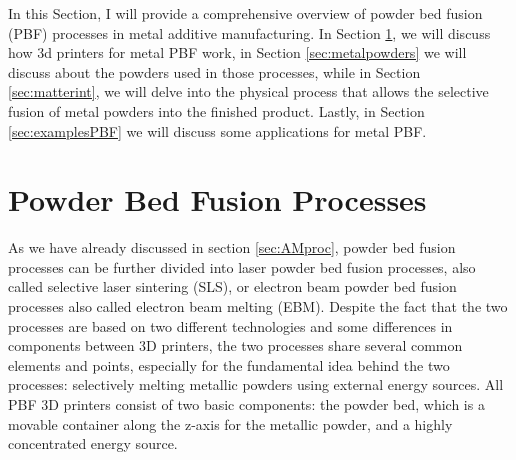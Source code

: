 \setlength{\tabcolsep}{10pt}
In this Section, I will provide a comprehensive overview of powder bed fusion (PBF) processes in metal additive manufacturing. In Section \ref{sec:pbf_proc}, we will discuss how 3d printers for metal PBF work, in Section \ref{sec:metalpowders} we will discuss about the powders used in those processes, while in Section \ref{sec:matterint}, we will delve into the physical process that allows the selective fusion of metal powders into the finished product. Lastly, in Section \ref{sec:examplesPBF} we will discuss some applications for metal PBF.
\section{Powder Bed Fusion Processes}\label{sec:pbf_proc}
As we have already discussed in section \ref{sec:AMproc}, powder bed fusion processes can be further divided into laser powder bed fusion processes, also called selective laser sintering (SLS), or electron beam powder bed fusion processes also called electron beam melting (EBM). Despite the fact that the two processes are based on two different technologies and some differences in components between 3D printers, the two processes share several common elements and points, especially for the fundamental idea behind the two processes: selectively melting metallic powders using external energy sources.
All PBF 3D printers consist of two basic components: the powder bed, which is a movable container along the z-axis for the metallic powder, and a highly concentrated energy source. 
